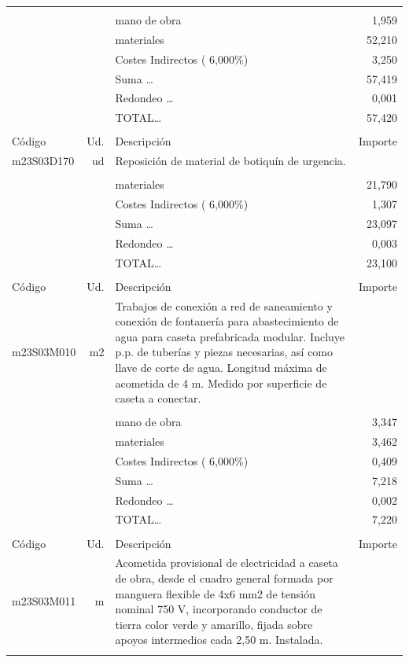 \begin{supertabular}{l r p{60mm} r}
&&&\\%
&&mano de obra&     1,959\\%
&&materiales&    52,210\\%
&&Costes Indirectos (     6,000\%)&     3,250\\%
&&Suma \ldots&    57,419\\%
&&Redondeo \ldots&     0,001\\%
%
&&TOTAL\ldots&    57,420\\%
&&&\\%
Código&Ud.&Descripción&Importe\\%
\hline%
m23S03D170&ud&Reposición de material de botiquín de urgencia.&\\%
&&&\\%
&&materiales&    21,790\\%
&&Costes Indirectos (     6,000\%)&     1,307\\%
&&Suma \ldots&    23,097\\%
&&Redondeo \ldots&     0,003\\%
%
&&TOTAL\ldots&    23,100\\%
&&&\\%
Código&Ud.&Descripción&Importe\\%
\hline%
m23S03M010&m2&Trabajos de conexión a red de saneamiento y conexión de fontanería para abastecimiento de agua para caseta prefabricada modular. Incluye p.p. de tuberías y piezas necesarias, así como llave de corte de agua. Longitud máxima de acometida de 4 m. Medido por superficie de caseta a conectar.&\\%
&&&\\%
&&mano de obra&     3,347\\%
&&materiales&     3,462\\%
&&Costes Indirectos (     6,000\%)&     0,409\\%
&&Suma \ldots&     7,218\\%
&&Redondeo \ldots&     0,002\\%
%
&&TOTAL\ldots&     7,220\\%
&&&\\%
Código&Ud.&Descripción&Importe\\%
\hline%
m23S03M011&m&Acometida provisional de electricidad a caseta de obra, desde el cuadro general formada por manguera flexible de 4x6 mm2 de tensión nominal 750 V, incorporando conductor de tierra color verde y amarillo, fijada sobre apoyos intermedios cada 2,50 m. Instalada.&\\%
&&&\\%

\end{supertabular}
